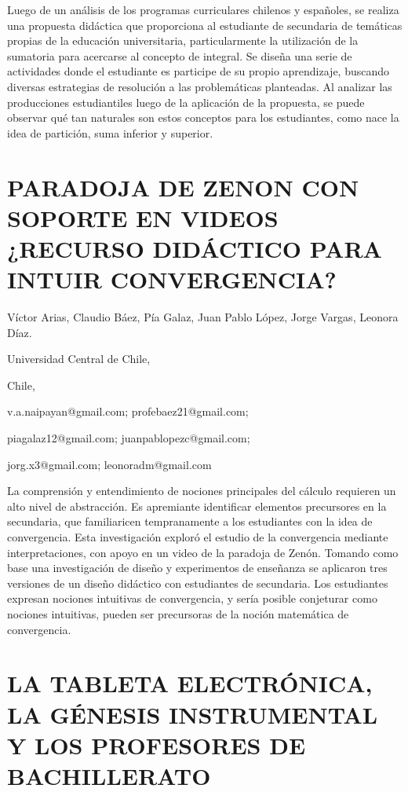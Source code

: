 Luego de un análisis de los programas curriculares chilenos y españoles,
se realiza una propuesta didáctica que proporciona al estudiante de
secundaria de temáticas propias de la educación universitaria, particularmente
la utilización de la sumatoria para acercarse al concepto de integral.
Se diseña una serie de actividades donde el estudiante es participe
de su propio aprendizaje, buscando diversas estrategias de resolución
a las problemáticas planteadas. Al analizar las producciones estudiantiles
luego de la aplicación de la propuesta, se puede observar qué tan
naturales son estos conceptos para los estudiantes, como nace la idea
de partición, suma inferior y superior.


\section{PARADOJA DE ZENON CON SOPORTE EN VIDEOS ¿RECURSO DIDÁCTICO PARA INTUIR
CONVERGENCIA? }

\begin{datos}

Víctor Arias, Claudio Báez, Pía Galaz, Juan Pablo López, Jorge Vargas,
Leonora Díaz.

Universidad Central de Chile,

Chile,

v.a.naipayan@gmail.com; profebaez21@gmail.com;

piagalaz12@gmail.com; juanpablopezc@gmail.com;

jorg.x3@gmail.com; leonoradm@gmail.com

\end{datos}

La comprensión y entendimiento de nociones principales del cálculo
requieren un alto nivel de abstracción. Es apremiante identificar
elementos precursores en la secundaria, que familiaricen tempranamente
a los estudiantes con la idea de convergencia. Esta investigación
exploró el estudio de la convergencia mediante interpretaciones, con
apoyo en un video de la paradoja de Zenón. Tomando como base una investigación
de diseño y experimentos de enseñanza se aplicaron tres versiones
de un diseño didáctico con estudiantes de secundaria. Los estudiantes
expresan nociones intuitivas de convergencia, y sería posible conjeturar
como nociones intuitivas, pueden ser precursoras de la noción matemática
de convergencia.


\section{LA TABLETA ELECTRÓNICA, LA GÉNESIS INSTRUMENTAL Y LOS PROFESORES
DE BACHILLERATO}

